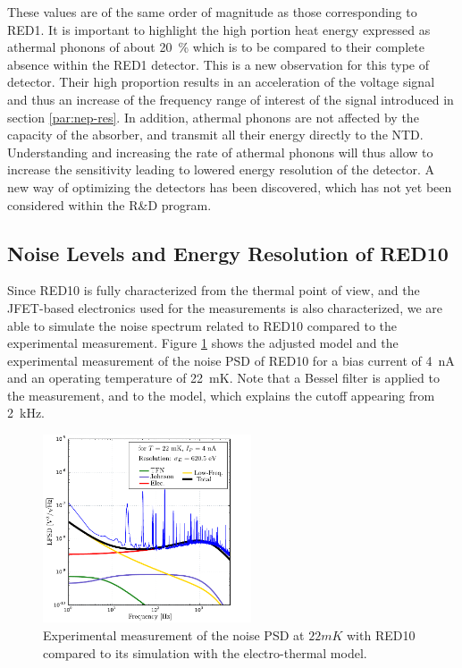 These values are of the same order of magnitude as those corresponding to RED1. It is important to highlight the high portion heat energy expressed as athermal phonons of about \SI{20}{\percent} which is to be compared to their complete absence within the RED1 detector. This is a new observation for this type of detector. Their high proportion results in an acceleration of the voltage signal and thus an increase of the frequency range of interest of the signal introduced in section \ref{par:nep-res}. In addition, athermal phonons are not affected by the capacity of the absorber, and transmit all their energy directly to the NTD. Understanding and increasing the rate of athermal phonons will thus allow to increase the sensitivity leading to lowered energy resolution of the detector. A new way of optimizing the detectors has been discovered, which has not yet been considered within the R\&D program.


\subsection{Noise Levels and Energy Resolution of RED10}

Since RED10 is fully characterized from the thermal point of view, and the JFET-based electronics used for the measurements is also characterized, we are able to simulate the noise spectrum related to RED10 compared to the experimental measurement. Figure \ref{fig:noise-red10} shows the adjusted model and the experimental measurement of the noise PSD of RED10 for a bias current of \SI{4}{\nano\ampere} and an operating temperature of \SI{22}{\milli\kelvin}. Note that a Bessel filter is applied to the measurement, and to the model, which explains the cutoff appearing from \SI{2}{\kilo\Hz}.

\begin{figure}
\begin{center}
\includegraphics[width=0.55\textwidth]{Figures/Ethem/modexp.pdf}
\end{center}
\caption{Experimental measurement of the noise PSD at $22 mK$ with RED10 compared to its simulation with the electro-thermal model.}
\label{fig:noise-red10}
\end{figure}

